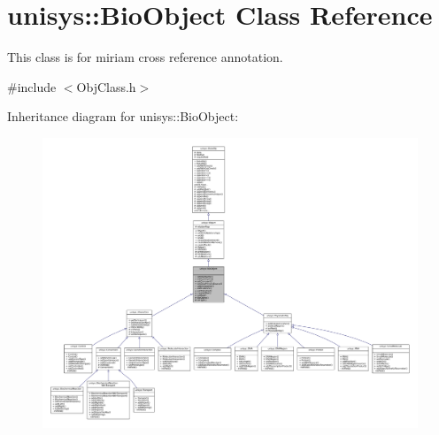 \hypertarget{classunisys_1_1BioObject}{\section{unisys\-:\-:Bio\-Object Class Reference}
\label{classunisys_1_1BioObject}
}


This class is for miriam cross reference annotation.  




{\ttfamily \#include $<$Obj\-Class.\-h$>$}



Inheritance diagram for unisys\-:\-:Bio\-Object\-:
\nopagebreak
\begin{figure}[H]
\begin{center}
\leavevmode
\includegraphics[width=350pt]{classunisys_1_1BioObject__inherit__graph}
\end{center}
\end{figure}


